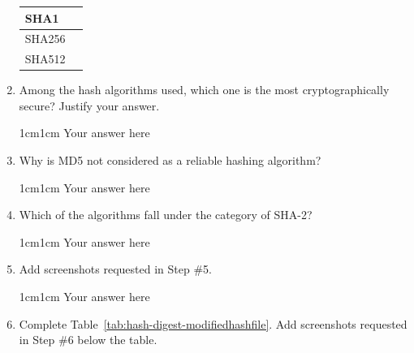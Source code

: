\documentclass[11pt,letterpaper]{article}
\newenvironment{answer}{\em \color{blue} \begin{adjustwidth}{1cm}{1cm}}{\end{adjustwidth}}
\begin{document}
\begin{enumerate}
\begin{table}[h!]
\begin{tabularx}{\columnwidth}{|p{4cm}|X|}
				\hline
				SHA1 &  \\\hline
				
				\hline
				SHA256 &  \\ \hline
				
				\hline
				SHA512 &  \\ \hline
				
			\end{tabularx}
		\end{table}
		
		
		\item Among the hash algorithms used, which one is the most cryptographically secure? Justify your answer.
		
		\begin{answer}
			Your answer here
		\end{answer}
		
		\item Why is MD5 not considered as a reliable hashing algorithm?
		
		\begin{answer}
			Your answer here
		\end{answer}
		
		\item Which of the algorithms fall under the category of SHA-2?
		\begin{answer}
			Your answer here
		\end{answer}
		
		\item Add screenshots requested in Step \#5.
		
		\begin{answer}
			Your answer here
		\end{answer}
		
		
		\item Complete Table~\ref{tab:hash-digest-modifiedhashfile}. Add screenshots requested in Step \#6 below the table.
		

\end{enumerate}
\end{document}

